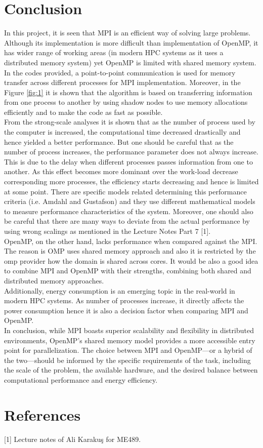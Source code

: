 \documentclass[12pt]{article}
\begin{document}
\section{Conclusion}
In this project, it is seen that MPI is an efficient way of solving large problems. Although its implementation is more difficult than implementation of OpenMP, it has wider range of working areas (in modern HPC systems as it uses a distributed memory system) yet OpenMP is limited with shared memory system. In the codes provided, a point-to-point communication is used for memory transfer across different processes for MPI implementation. Moreover, in the Figure \ref{fig:1} it is shown that the algorithm is based on transferring information from one process to another by using shadow nodes to use memory allocations efficiently and to make the code as fast as possible.\\
From the strong-scale analyses it is shown that as the number of process used by the computer is increased, the computational time decreased drastically and hence yielded a better performance. But one should be careful that as the number of process increases, the performance parameter does not always increase. This is due to the delay when different processes passes information from one to another. As this effect becomes more dominant over the work-load decrease corresponding more processes, the efficiency starts decreasing and hence is limited at some point. There are specific models related determining this performance criteria (i.e. Amdahl and Gustafson) and they use different mathematical models to measure performance characteristics of the system. Moreover, one should also be careful that there are many ways to deviate from the actual performance by using wrong scalings as mentioned in the Lecture Notes Part 7 [1]. \\
OpenMP, on the other hand, lacks performance when compared against the MPI. The reason is OMP uses shared memory approach and also it is restricted by the omp provider how the domain is shared across cores. It would be also a good idea to combine MPI and OpenMP with their strengths, combining both shared and distributed memory approaches.\\
Additionally, energy consumption is an emerging topic in the real-world in modern HPC systems. As number of processes increase, it directly affects the power consumption hence it is also a decision factor when comparing MPI and OpenMP.\\
In conclusion, while MPI boasts superior scalability and flexibility in distributed environments, OpenMP's shared memory model provides a more accessible entry point for parallelization. The choice between MPI and OpenMP—or a hybrid of the two—should be informed by the specific requirements of the task, including the scale of the problem, the available hardware, and the desired balance between computational performance and energy efficiency.
\noindent

\newpage
\section{References}
[1] Lecture notes of Ali Karakuş for ME489.
\end{document}
